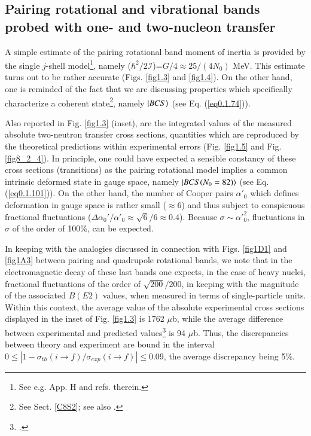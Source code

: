   \subsection[Pairing rotational and vibrational bands with transfer]{Pairing rotational and vibrational bands probed with one- and two-nucleon transfer}\label{S3.1.1}
  A simple estimate of the pairing rotational band moment of inertia is provided by the single $j$-shell model\footnote{See e.g. \cite{Brink:05} App. H and refs. therein.}, namely ($\hbar^2/2\mathcal I$)=$G/4\approx25/(4N_0)$ MeV. This estimate turns out to be rather accurate (Figs. \ref{fig1.3} and \ref{fig1.4}). On the other hand, one is reminded of the fact that we are discussing properties which specifically characterize a coherent state\footnote{See  Sect. \ref{C8S2}; see also \cite{Potel:17}.}, namely $|{BCS} \rangle$ (see Eq. (\ref{eq0.1.74})).
  
  

  Also reported in  Fig. \ref{fig1.3} (inset), are the integrated values of the measured absolute two-neutron transfer cross sections, 
   quantities which are reproduced by the theoretical predictions within experimental errors (Fig. \ref{fig1.5} and Fig. \ref{fig8_2_4}). In principle, one could have expected a sensible constancy of these cross sections (transitions) as the pairing rotational model implies a common intrinsic deformed state in gauge space, namely $|{BCS (N_0=82)} \rangle$ (see Eq. (\ref{eq0.1.101})). On the other hand, the number of Cooper pairs $\alpha'_0$ 
   which defines deformation in gauge space is rather small ($\approx6$) and thus subject to conspicuous fractional fluctuations  ($\Delta\alpha_0'/\alpha'_0\approx\sqrt{6}/6\approx 0.4$).  Because $\sigma\sim\alpha'^{2}_0$, fluctuations in $\sigma$ of the order of 100\%, can be expected.  
  
  In keeping with the analogies discussed in connection with Figs. \ref{fig1D1} and \ref{fig1A3}  between pairing and quadrupole rotational bands, we note that in the electromagnetic decay of these last bands one expects, in the case of heavy nuclei, fractional fluctuations of the order of $\sqrt{200}/200$, in keeping with the magnitude of the associated $B(E2)$ values, when measured in terms of single-particle units. Within this context, the average value of the absolute experimental cross sections displayed in the inset of Fig. \ref{fig1.3} is 1762 $\mu$b, while the average difference between experimental and predicted values\footnote{\cite{Potel:13b}.} is 94 $\mu$b. Thus, the discrepancies between theory and experiment are bound in the interval $0\leq|1-\sigma_{th}(i\to f)/\sigma_{exp}(i\to f)|\leq 0.09$, the average discrepancy being 5\%.
  

